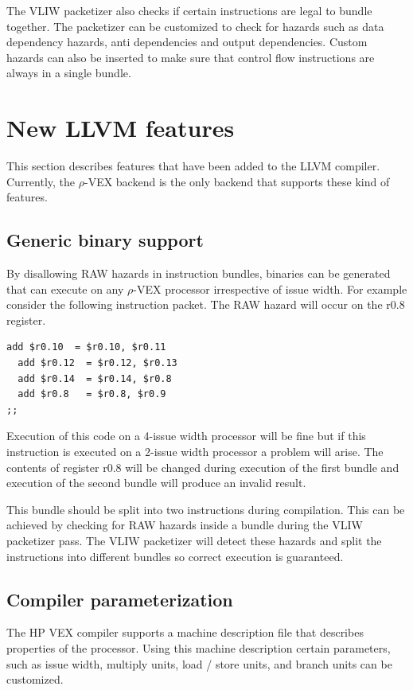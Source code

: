 The VLIW packetizer also checks if certain instructions are legal to bundle together. The packetizer can be customized to check for hazards such as data dependency hazards, anti dependencies and output dependencies. Custom hazards can also be inserted to make sure that control flow instructions are always in a single bundle.

\section{New LLVM features}
This section describes features that have been added to the LLVM compiler. Currently, the $\rho$-VEX backend is the only backend that supports these kind of features.

\subsection{Generic binary support}

By disallowing RAW hazards in instruction bundles, binaries can be generated that can execute on any $\rho$-VEX processor irrespective of issue width. For example consider the following instruction packet. The RAW hazard will occur on the r0.8 register.

\begin{lstlisting}[language=rvex]
  add $r0.10  = $r0.10, $r0.11
  add $r0.12  = $r0.12, $r0.13
  add $r0.14  = $r0.14, $r0.8
  add $r0.8   = $r0.8, $r0.9
;; 
\end{lstlisting}

Execution of this code on a 4-issue width processor will be fine but if this instruction is executed on a 2-issue width processor a problem will arise. The contents of register r0.8 will be changed during execution of the first bundle and execution of the second bundle will produce an invalid result.

This bundle should be split into two instructions during compilation. This can be achieved by checking for RAW hazards inside a bundle during the VLIW packetizer pass. The VLIW packetizer will detect these hazards and split the instructions into different bundles so correct execution is guaranteed.

\subsection{Compiler parameterization}
The HP VEX compiler supports a machine description file that describes properties of the processor. Using this machine description certain parameters, such as issue width, multiply units, load / store units, and branch units can be customized. 

